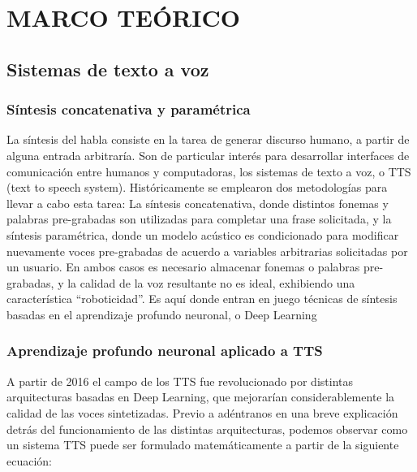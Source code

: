 \section{MARCO TEÓRICO}


\subsection{Sistemas de texto a voz}

\subsubsection{Síntesis concatenativa y paramétrica}
La síntesis del habla consiste en la tarea de generar discurso humano, a partir de alguna entrada arbitraría. Son de particular interés para desarrollar interfaces de comunicación entre humanos y computadoras, los sistemas de texto a voz, o TTS (text to speech system). 
Históricamente se emplearon dos metodologías para llevar a cabo esta tarea: La síntesis concatenativa, donde distintos fonemas y palabras pre-grabadas son utilizadas para completar una frase solicitada, y la síntesis paramétrica, donde un modelo acústico es condicionado para modificar nuevamente voces pre-grabadas de acuerdo a variables arbitrarias solicitadas por un usuario. En ambos casos es necesario almacenar fonemas o palabras pre-grabadas, y la calidad de la voz resultante no es ideal, exhibiendo una característica “roboticidad''. Es aquí donde entran en juego técnicas de síntesis basadas en el aprendizaje profundo neuronal, o Deep Learning

%
%
%
\subsubsection{Aprendizaje profundo neuronal aplicado a TTS}
A partir de 2016 el campo de los TTS fue revolucionado por distintas arquitecturas basadas en Deep Learning, que mejorarían considerablemente la calidad de las voces sintetizadas. Previo a adéntranos en una breve explicación detrás del funcionamiento de las distintas arquitecturas, podemos observar como un sistema TTS puede ser formulado matemáticamente a partir de la siguiente ecuación:

